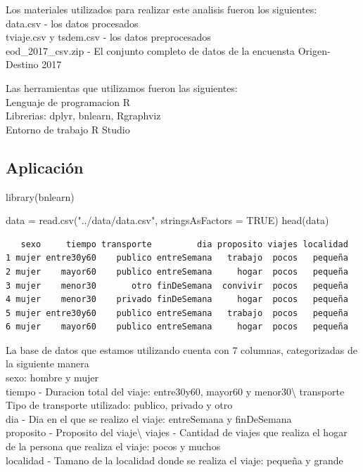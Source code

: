 \documentclass[
  11pt,
  a4paper,
]{article}
\newenvironment{Shaded}{\begin{snugshade}}{\end{snugshade}}
\newcommand{\AttributeTok}[1]{\textcolor[rgb]{0.40,0.45,0.13}{#1}}
\newcommand{\ConstantTok}[1]{\textcolor[rgb]{0.56,0.35,0.01}{#1}}
\newcommand{\FunctionTok}[1]{\textcolor[rgb]{0.28,0.35,0.67}{#1}}
\newcommand{\NormalTok}[1]{\textcolor[rgb]{0.00,0.23,0.31}{#1}}
\newcommand{\OtherTok}[1]{\textcolor[rgb]{0.00,0.23,0.31}{#1}}
\newcommand{\StringTok}[1]{\textcolor[rgb]{0.13,0.47,0.30}{#1}}
\begin{document}
Los materiales utilizados para realizar este analisis fueron los
siguientes:\\
data.csv - los datos procesados\\
tviaje.csv y tsdem.csv - los datos preprocesados\\
eod\_2017\_csv.zip - El conjunto completo de datos de la encuensta
Origen-Destino 2017

Las herramientas que utilizamos fueron las siguientes:\\
Lenguaje de programacion R\\
Librerias: dplyr, bnlearn, Rgraphviz\\
Entorno de trabajo R Studio

\subsection{Aplicación}\label{aplicaciuxf3n}

\begin{Shaded}
\begin{Highlighting}[numbers=left,,]
\FunctionTok{library}\NormalTok{(bnlearn)}

\NormalTok{data }\OtherTok{=} \FunctionTok{read.csv}\NormalTok{(}\StringTok{"../data/data.csv"}\NormalTok{, }\AttributeTok{stringsAsFactors =} \ConstantTok{TRUE}\NormalTok{)}
\FunctionTok{head}\NormalTok{(data)}
\end{Highlighting}
\end{Shaded}

\begin{verbatim}
   sexo     tiempo transporte         dia proposito viajes localidad
1 mujer entre30y60    publico entreSemana   trabajo  pocos   pequeña
2 mujer    mayor60    publico entreSemana     hogar  pocos   pequeña
3 mujer    menor30       otro finDeSemana  convivir  pocos   pequeña
4 mujer    menor30    privado finDeSemana     hogar  pocos   pequeña
5 mujer entre30y60    publico entreSemana   trabajo  pocos   pequeña
6 mujer    mayor60    publico entreSemana     hogar  pocos   pequeña
\end{verbatim}

La base de datos que estamos utilizando cuenta con 7 columnas,
categorizadas de la siguiente manera\\
sexo: hombre y mujer\\
tiempo - Duracion total del viaje: entre30y60, mayor60 y
menor30\textbackslash{} transporte\\
Tipo de transporte utilizado: publico, privado y otro\\
dia - Dia en el que se realizo el viaje: entreSemana y finDeSemana\\
proposito - Proposito del viaje\textbackslash{} viajes - Cantidad de
viajes que realiza el hogar de la persona que realiza el viaje: pocos y
muchos\\
localidad - Tamano de la localidad donde se realiza el viaje: pequeña y
grande
\end{document}

